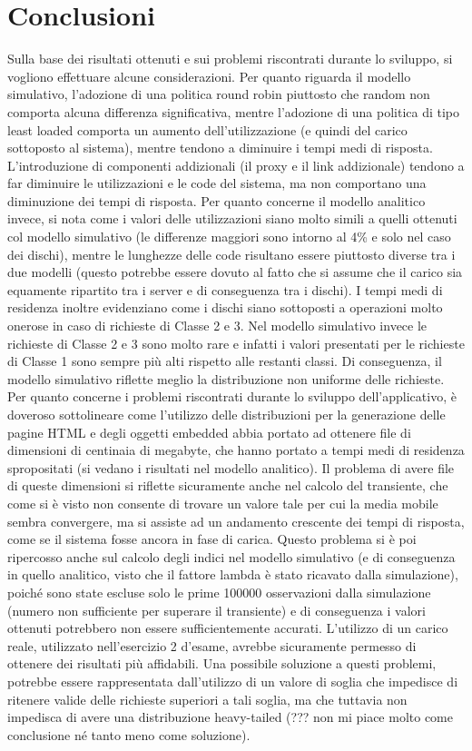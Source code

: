 \chapter{Conclusioni}
Sulla base dei risultati ottenuti e sui problemi riscontrati durante lo sviluppo, si vogliono effettuare alcune considerazioni.
Per quanto riguarda il modello simulativo, l'adozione di una politica round robin piuttosto che random non comporta alcuna differenza significativa, mentre l'adozione di una politica di tipo least loaded comporta un aumento dell'utilizzazione (e quindi del carico sottoposto al sistema), mentre tendono a diminuire i tempi medi di risposta. L'introduzione di componenti addizionali (il proxy e il link addizionale) tendono a far diminuire le utilizzazioni e le code del sistema, ma non comportano una diminuzione dei tempi di risposta. 
Per quanto concerne il modello analitico invece, si nota come i valori delle utilizzazioni siano molto simili a quelli ottenuti col modello simulativo (le differenze maggiori sono intorno al 4\% e solo nel caso dei dischi), mentre le lunghezze delle code risultano essere piuttosto diverse tra i due modelli (questo potrebbe essere dovuto al fatto che si assume che il carico sia equamente ripartito tra i server e di conseguenza tra i dischi). I tempi medi di residenza inoltre evidenziano come i dischi siano sottoposti a operazioni molto onerose in caso di richieste di Classe 2 e 3. Nel modello simulativo invece le richieste di Classe 2 e 3 sono molto rare e infatti i valori presentati per le richieste di Classe 1 sono sempre più alti rispetto alle restanti classi. Di conseguenza, il modello simulativo riflette meglio la distribuzione non uniforme delle richieste.
Per quanto concerne i problemi riscontrati durante lo sviluppo dell'applicativo, è doveroso sottolineare come l'utilizzo delle distribuzioni per la generazione delle pagine HTML e degli oggetti embedded abbia portato ad ottenere file di dimensioni di centinaia di megabyte, che hanno portato a  tempi medi di residenza spropositati (si vedano i risultati nel modello analitico). Il problema di avere file di queste dimensioni si riflette sicuramente anche nel calcolo del transiente, che come si è visto non consente di trovare un valore tale per cui la media mobile sembra convergere, ma si assiste ad un andamento crescente dei tempi di risposta, come se il sistema fosse ancora in fase di carica. Questo problema si è poi ripercosso anche sul calcolo degli indici nel modello simulativo (e di conseguenza in quello analitico, visto che il fattore lambda è stato ricavato dalla simulazione), poiché sono state escluse solo le prime 100000 osservazioni dalla simulazione (numero non sufficiente per superare il transiente) e di conseguenza i valori ottenuti potrebbero non essere sufficientemente accurati. L'utilizzo di un carico reale, utilizzato nell'esercizio 2 d'esame, avrebbe sicuramente permesso di ottenere dei risultati più affidabili. 
Una possibile soluzione a questi problemi, potrebbe essere rappresentata dall'utilizzo di un valore di soglia che impedisce di ritenere valide delle richieste superiori a tali soglia, ma che tuttavia non impedisca di avere una distribuzione heavy-tailed (??? non mi piace molto come conclusione né tanto meno come soluzione).
